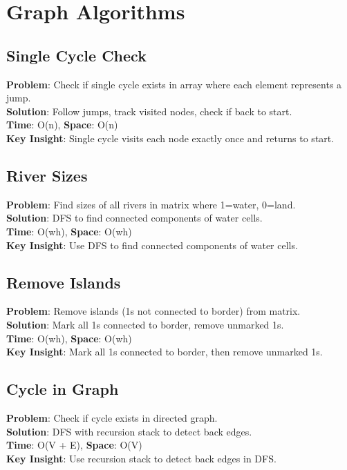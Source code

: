 \documentclass{report}
\begin{document}
\section{Graph Algorithms}

\subsection{Single Cycle Check}
\textbf{Problem}: Check if single cycle exists in array where each element represents a jump.\\
\textbf{Solution}: Follow jumps, track visited nodes, check if back to start.\\
\textbf{Time}: O(n), \textbf{Space}: O(n)\\
\textbf{Key Insight}: Single cycle visits each node exactly once and returns to start.

\subsection{River Sizes}
\textbf{Problem}: Find sizes of all rivers in matrix where 1=water, 0=land.\\
\textbf{Solution}: DFS to find connected components of water cells.\\
\textbf{Time}: O(wh), \textbf{Space}: O(wh)\\
\textbf{Key Insight}: Use DFS to find connected components of water cells.

\subsection{Remove Islands}
\textbf{Problem}: Remove islands (1s not connected to border) from matrix.\\
\textbf{Solution}: Mark all 1s connected to border, remove unmarked 1s.\\
\textbf{Time}: O(wh), \textbf{Space}: O(wh)\\
\textbf{Key Insight}: Mark all 1s connected to border, then remove unmarked 1s.

\subsection{Cycle in Graph}
\textbf{Problem}: Check if cycle exists in directed graph.\\
\textbf{Solution}: DFS with recursion stack to detect back edges.\\
\textbf{Time}: O(V + E), \textbf{Space}: O(V)\\
\textbf{Key Insight}: Use recursion stack to detect back edges in DFS.
\end{document}
